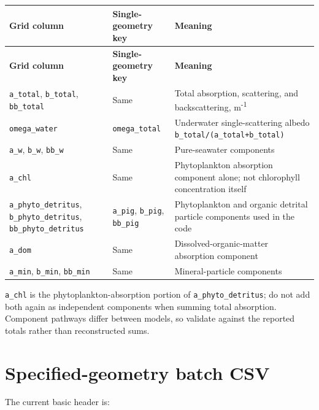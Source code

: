 {\TableFont
\begin{longtable}{@{}>{\raggedright\arraybackslash}p{}>{\raggedright\arraybackslash}p{}>{\raggedright\arraybackslash}p{}@{}}
\toprule
\textbf{Grid column} & \textbf{Single-geometry key} & \textbf{Meaning} \\
\midrule
\endfirsthead
\toprule
\textbf{Grid column} & \textbf{Single-geometry key} & \textbf{Meaning} \\
\midrule
\endhead
\bottomrule
\endfoot
\texttt{a\_\allowbreak{}total}, \texttt{b\_\allowbreak{}total}, \texttt{bb\_\allowbreak{}total} & Same & Total absorption, scattering, and backscattering, m\textsuperscript{-}\textsuperscript{1} \\
\texttt{omega\_\allowbreak{}water} & \texttt{omega\_\allowbreak{}total} & Underwater single-scattering albedo \texttt{b\_\allowbreak{}total/\allowbreak{}(a\_\allowbreak{}total+b\_\allowbreak{}total)} \\
\texttt{a\_\allowbreak{}w}, \texttt{b\_\allowbreak{}w}, \texttt{bb\_\allowbreak{}w} & Same & Pure-seawater components \\
\texttt{a\_\allowbreak{}chl} & Same & Phytoplankton absorption component alone; not chlorophyll concentration itself \\
\texttt{a\_\allowbreak{}phyto\_\allowbreak{}detritus}, \texttt{b\_\allowbreak{}phyto\_\allowbreak{}detritus}, \texttt{bb\_\allowbreak{}phyto\_\allowbreak{}detritus} & \texttt{a\_\allowbreak{}pig}, \texttt{b\_\allowbreak{}pig}, \texttt{bb\_\allowbreak{}pig} & Phytoplankton and organic detrital particle components used in the code \\
\texttt{a\_\allowbreak{}dom} & Same & Dissolved-organic-matter absorption component \\
\texttt{a\_\allowbreak{}min}, \texttt{b\_\allowbreak{}min}, \texttt{bb\_\allowbreak{}min} & Same & Mineral-particle components \\
\end{longtable}
}

\texttt{a\_\allowbreak{}chl} is the phytoplankton-absorption portion of \texttt{a\_\allowbreak{}phyto\_\allowbreak{}detritus}; do not add both again as independent components when summing total absorption. Component pathways differ between models, so validate against the reported totals rather than reconstructed sums.

\section{Specified-geometry batch CSV}
\label{sec:auto:05_output_formats:8}
The current basic header is:


